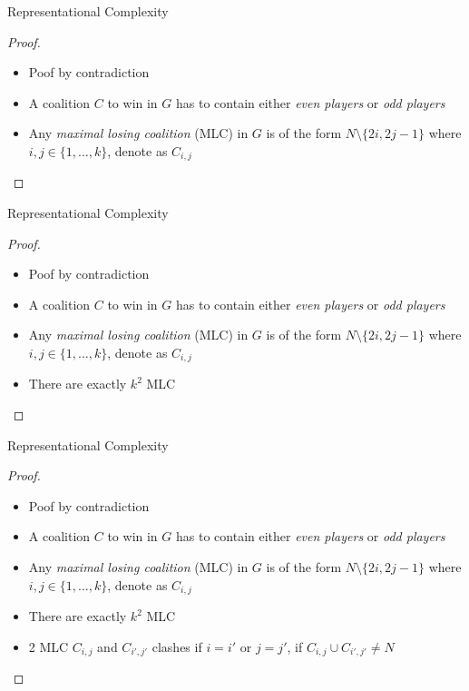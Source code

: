\documentclass{beamer}
\begin{document}
\begin{frame}[fragile]{Representational Complexity}
  \begin{proof}
    \begin{itemize}
      \item Poof by contradiction
      \item A coalition $C$ to win in $G$ has to contain either \textit{even players} or \textit{odd players}
      \item Any \textit{maximal losing coalition} (MLC) in $G$ is of the form $N \setminus \{2i, 2j - 1\}$ where
      $i,j \in \{1,\dots,k\}$, denote as $C_{i,j}$
    \end{itemize}
  \end{proof}
\end{frame}

\begin{frame}[fragile]{Representational Complexity}
  \begin{proof}
    \begin{itemize}
      \item Poof by contradiction
      \item A coalition $C$ to win in $G$ has to contain either \textit{even players} or \textit{odd players}
      \item Any \textit{maximal losing coalition} (MLC) in $G$ is of the form $N \setminus \{2i, 2j - 1\}$ where
      $i,j \in \{1,\dots,k\}$, denote as $C_{i,j}$
      \item There are exactly $k^2$ MLC
    \end{itemize}
  \end{proof}
\end{frame}

\begin{frame}[fragile]{Representational Complexity}
  \begin{proof}
    \begin{itemize}
      \item Poof by contradiction
      \item A coalition $C$ to win in $G$ has to contain either \textit{even players} or \textit{odd players}
      \item Any \textit{maximal losing coalition} (MLC) in $G$ is of the form $N \setminus \{2i, 2j - 1\}$ where
      $i,j \in \{1,\dots,k\}$, denote as $C_{i,j}$
      \item There are exactly $k^2$ MLC
      \item 2 MLC $C_{i,j}$ and $C_{i',j'}$ clashes if $i=i'$ or $j= j'$, if $C_{i,j} \cup C_{i',j'} \neq N$
    \end{itemize}
  \end{proof}
\end{frame}
\end{document}
